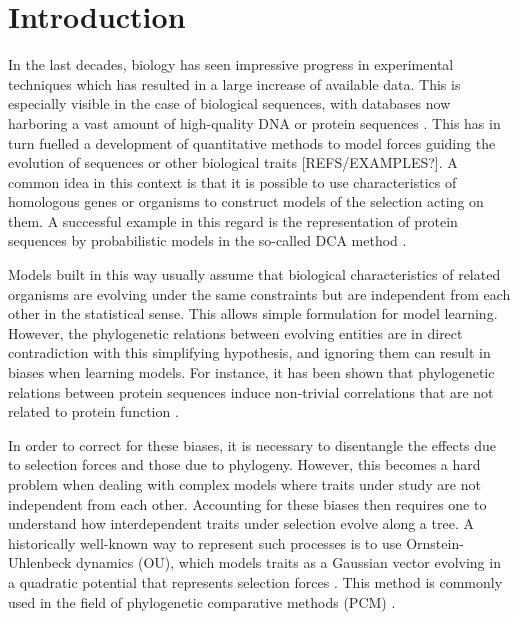 \documentclass[preprint,amsmath,amssymb,superscriptaddress,showpacs,pre]{revtex4-1}
\begin{document}
\maketitle


\section{Introduction}
\label{sec:int}

In the last decades, biology has seen impressive progress in experimental techniques which has resulted in a large increase of available data. 
This is especially visible in the case of biological sequences,  with databases now harboring a vast amount of high-quality DNA or protein sequences \cite{sayers_genbank_2019,uniprotconsortium_uniprot_2018}. 
This has in turn fuelled a development of quantitative methods to model forces guiding the evolution of sequences or other biological traits [REFS/EXAMPLES?]. 
A common idea in this context is that it is possible to use characteristics of homologous genes or organisms to construct models of the selection acting on them. 
A successful example in this regard is the representation of protein sequences by probabilistic models in the so-called DCA method \cite{levy_potts_2017,cocco_inverse_2018}. 

Models built in this way usually assume that biological characteristics of related organisms are evolving under the same constraints but are independent from each other in the statistical sense. 
This allows simple formulation for model learning. 
However, the phylogenetic relations between evolving entities are in direct contradiction with this simplifying hypothesis, and ignoring them can result in biases when learning models. 
For instance, it has been shown that phylogenetic relations between protein sequences induce non-trivial correlations that are not related to protein function \cite{qin_power_2018}. 

In order to correct for these biases, it is necessary to disentangle the effects due to selection forces and those due to phylogeny. 
However, this becomes a hard problem when dealing with complex models where traits under study are not independent from each other. 
Accounting for these biases then requires one to understand how interdependent traits under selection evolve along a tree. 
A historically well-known way to represent such processes is to use Ornstein-Uhlenbeck dynamics (OU), which models traits as a Gaussian vector evolving in a quadratic potential that represents selection forces \cite{uhlenbeck_theory_1930, felsenstein_phylogenies_1988, hansen_stabilizing_1997}.
This method is commonly used in the field of phylogenetic comparative methods (PCM) \cite{bartoszek_phylogenetic_2012,mitov_fast_2020}. 
\end{document}
